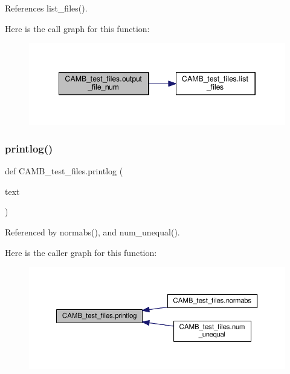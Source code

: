 References list\+\_\+files().

Here is the call graph for this function\+:
\nopagebreak
\begin{figure}[H]
\begin{center}
\leavevmode
\includegraphics[width=346pt]{namespaceCAMB__test__files_a2aa5d4f5677cf5a78388238c4dc45b7d_cgraph}
\end{center}
\end{figure}
\mbox{\label{namespaceCAMB__test__files_a55a6c3bc344b92ad1a96f55cfc36f619}} 
\subsubsection{\texorpdfstring{printlog()}{printlog()}}
{\footnotesize\ttfamily def C\+A\+M\+B\+\_\+test\+\_\+files.\+printlog (\begin{DoxyParamCaption}\item[{}]{text }\end{DoxyParamCaption})}



Referenced by normabs(), and num\+\_\+unequal().

Here is the caller graph for this function\+:
\nopagebreak
\begin{figure}[H]
\begin{center}
\leavevmode
\includegraphics[width=350pt]{namespaceCAMB__test__files_a55a6c3bc344b92ad1a96f55cfc36f619_icgraph}
\end{center}
\end{figure}
\mbox{\label{namespaceCAMB__test__files_a1aa48bd86ed68f1c0b441e871086dbfa}} 
